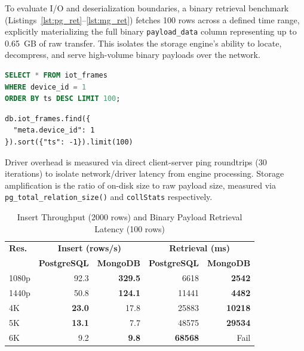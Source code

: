 \documentclass[conference, a4paper]{IEEEtran}
\begin{document}
To evaluate I/O and deserialization boundaries, a binary retrieval benchmark (Listings~\ref{lst:pg_ret}--\ref{lst:mg_ret}) fetches 100 rows across a defined time range, explicitly materializing the full binary \texttt{payload\_data} column representing up to 0.65~GB of raw transfer. This isolates the storage engine's ability to locate, decompress, and serve high-volume binary payloads over the network.

\begin{lstlisting}[language=SQL,basicstyle=\ttfamily\scriptsize,breaklines=true,caption={PostgreSQL binary retrieval query.},label={lst:pg_ret}]
SELECT * FROM iot_frames
WHERE device_id = 1
ORDER BY ts DESC LIMIT 100;
\end{lstlisting}

\begin{lstlisting}[basicstyle=\ttfamily\scriptsize,breaklines=true,caption={MongoDB binary retrieval pipeline.},label={lst:mg_ret}]
db.iot_frames.find({
  "meta.device_id": 1
}).sort({"ts": -1}).limit(100)
\end{lstlisting}

Driver overhead is measured via direct client-server ping roundtrips (30 iterations) to isolate network/driver latency from engine processing. Storage amplification is the ratio of on-disk size to raw payload size, measured via \texttt{pg\_total\_relation\_size()} and \texttt{collStats} respectively.


\begin{table}[htbp]
\centering
\renewcommand{\arraystretch}{1.1}
\caption{Insert Throughput (2000 rows) and Binary Payload Retrieval Latency (100 rows)}
\label{tab:performance_summary}
\begin{tabular}{l r r r r}
\hline
\textbf{Res.} & \multicolumn{2}{c}{\textbf{Insert (rows/s)}} & \multicolumn{2}{c}{\textbf{Retrieval (ms)}} \\
 & \textbf{PostgreSQL} & \textbf{MongoDB} & \textbf{PostgreSQL} & \textbf{MongoDB} \\
\hline
1080p & 92.3  & \textbf{329.5} & 6618   & \textbf{2542}   \\
1440p & 50.8  & \textbf{124.1}  & 11441   & \textbf{4482}   \\
4K    & \textbf{23.0}   & 17.8   & 25883   & \textbf{10218}  \\
5K    & \textbf{13.1}   & 7.7   & 48575   & \textbf{29534}  \\
6K    & 9.2   & \textbf{9.8}  & \textbf{68568}   & Fail  \\
\hline
\end{tabular}
\end{table}
\end{document}
